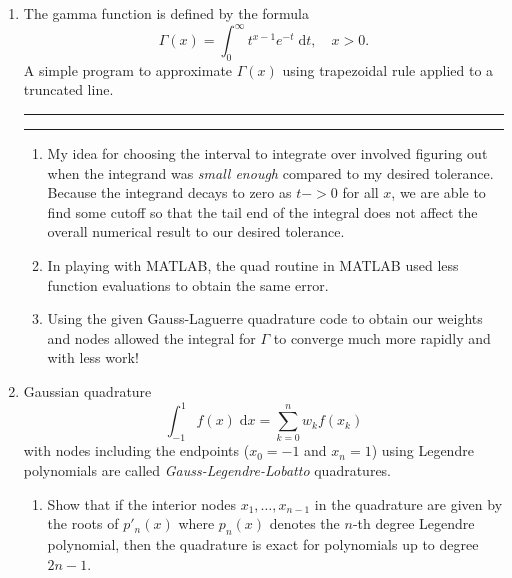 \documentclass[a4paper,12pt]{article}
\newcommand{\dd}[1]{\mathrm{d}#1}
\begin{document}
\begin{enumerate}[label = \arabic*.]
		\newpage
		\item
			The gamma function is defined by the formula
			\[
				\Gamma(x) = \int_{0}^{\infty} t^{x - 1} e^{-t} \;\dd t, \quad x > 0.
			\]
			A simple program to approximate $ \Gamma(x) $ using trapezoidal rule applied to a truncated line.
			
			\rule{\textwidth}{.4pt}
				
			\rule{\textwidth}{.4pt}	
			
			\begin{enumerate}[label = (\alph*)]
				\item My idea for choosing the interval to integrate over involved figuring out when the integrand was \emph{small enough} compared to my desired tolerance. Because the integrand decays to zero as $ t -> 0 $ for all $ x $, we are able to find some cutoff so that the tail end of the integral does not affect the overall numerical result to our desired tolerance. 
				
				\item In playing with MATLAB, the quad routine in MATLAB used less function evaluations to obtain the same error.
				
				\item Using the given Gauss-Laguerre quadrature code to obtain our weights and nodes allowed the integral for $ \Gamma $ to converge much more rapidly and with less work!
			\end{enumerate}
		
		\newpage
		\item
			Gaussian quadrature
			\[
				\int_{-1}^{1} f(x) \;\dd x = \sum_{k = 0}^{n} w_k f(x_k)
			\]
			with nodes including the endpoints ($ x_0 = -1 $ and $ x_n = 1 $) using Legendre polynomials are called \emph{Gauss-Legendre-Lobatto} quadratures.
			\begin{enumerate}[label = (\roman*)]
				\item Show that if the interior nodes $ x_1, \ldots, x_{n - 1} $ in the quadrature are given by the roots of $ p'_n(x) $ where $ p_n(x) $ denotes the $ n $-th degree Legendre polynomial, then the quadrature is exact for polynomials up to degree $ 2n - 1 $.
				

\end{enumerate}
\end{enumerate}
\end{document}

